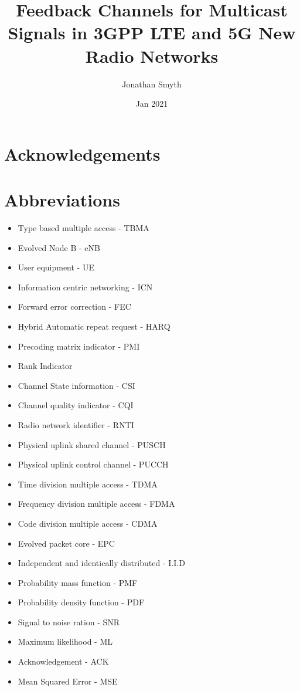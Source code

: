 \documentclass{article}
\title{Feedback Channels for Multicast Signals in 3GPP LTE and 5G New Radio Networks}
\author{Jonathan Smyth}
\date{Jan 2021}
\begin{document}
\maketitle
\newpage 
\tableofcontents
\newpage

\section{Acknowledgements}

\newpage

\section{Abbreviations}
\begin{itemize}
\item Type based multiple access - TBMA
\item Evolved Node B - eNB
\item User equipment - UE
\item Information centric networking - ICN
\item Forward error correction - FEC
\item Hybrid Automatic repeat request - HARQ
\item Precoding matrix indicator - PMI 
\item Rank Indicator 
\item Channel State information - CSI 
\item Channel quality indicator - CQI 
\item Radio network identifier - RNTI
\item Physical uplink shared channel - PUSCH
\item Physical uplink control channel - PUCCH
\item Time division multiple access - TDMA 
\item Frequency division multiple access - FDMA
\item Code division multiple access - CDMA
\item Evolved packet core - EPC
\item Independent and identically distributed - I.I.D
\item Probability mass function - PMF
\item Probability density function - PDF
\item Signal to noise ration - SNR 
\item Maximum likelihood - ML
\item Acknowledgement - ACK
\item Mean Squared Error - MSE 

\end{itemize}
\end{document}
